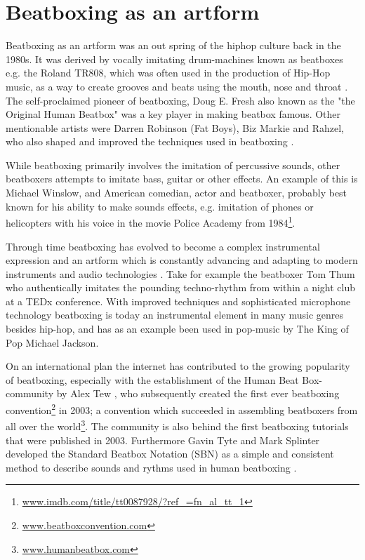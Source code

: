 \section{Beatboxing as an artform}
Beatboxing as an artform was an out spring of the hiphop culture back in the 1980s. It was derived by vocally imitating drum-machines known as beatboxes e.g. the Roland TR808, which was often used in the production of Hip-Hop music, as a way to create grooves and beats using the mouth, nose and throat \citep{proctor2012}. The self-proclaimed pioneer of beatboxing, Doug E. Fresh also known as the "the Original Human Beatbox" was a key player in making beatbox famous. Other mentionable artists were Darren Robinson (Fat Boys), Biz Markie and Rahzel, who also shaped and improved the techniques used in beatboxing \citep{Hess2007}.

While beatboxing primarily involves the imitation of percussive sounds, other beatboxers attempts to imitate bass, guitar or other effects. An example of this is Michael Winslow, and American comedian, actor and beatboxer, probably best known for his ability to make sounds effects, e.g. imitation of phones or helicopters with his voice in the movie Police Academy from 1984\footnote{\url{www.imdb.com/title/tt0087928/?ref_=fn_al_tt_1}}. 

Through time beatboxing has evolved to become a complex instrumental expression and an artform which is constantly advancing and adapting to modern instruments and audio technologies \citep{proctor2012}. Take for example the beatboxer Tom Thum who authentically imitates the pounding techno-rhythm from within a night club at a TEDx conference\citep{TEDx}. With improved techniques and sophisticated microphone technology beatboxing is today an instrumental element in many music genres besides hip-hop, and has as an example been used in pop-music by The King of Pop Michael Jackson\citep{MJ}.

On an international plan the internet has contributed to the growing popularity of beatboxing, especially with the establishment of the Human Beat Box-community by Alex Tew , who subsequently created the first ever beatboxing convention\footnote{\url{www.beatboxconvention.com}} in 2003; a convention which succeeded in assembling beatboxers from all over the world\footnote{\url{www.humanbeatbox.com}}.
The community is also behind the first beatboxing tutorials that were published in 2003. Furthermore Gavin Tyte and Mark Splinter developed the Standard Beatbox Notation (SBN) as a simple and consistent method to describe sounds and rythms used in human beatboxing \citep{Tyte}.